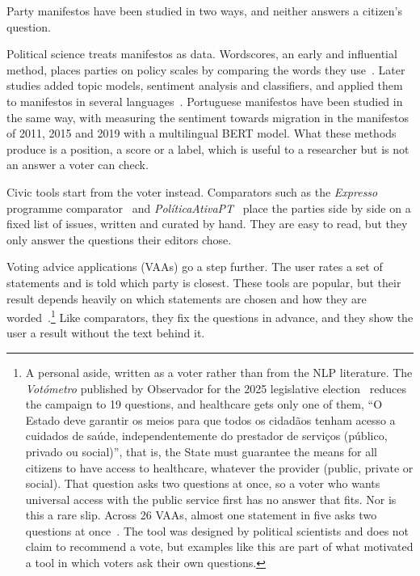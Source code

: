 Party manifestos have been studied in two ways, and neither answers a citizen's question.

Political science treats manifestos as data. Wordscores, an early and influential method, places parties on policy scales by comparing the words they use~\citep{laver_benoit_garry}. Later studies added topic models, sentiment analysis and classifiers, and applied them to manifestos in several languages~\citep{manifestos-nz,manifestos-central-eastern}. Portuguese manifestos have been studied in the same way, with \citet{marino-etal-2024-decoding} measuring the sentiment towards migration in the manifestos of 2011, 2015 and 2019 with a multilingual BERT model. What these methods produce is a position, a score or a label, which is useful to a researcher but is not an answer a voter can check.

Civic tools start from the voter instead. Comparators such as the \textit{Expresso} programme comparator~\citep{expresso-comparador} and \textit{PolíticaAtivaPT}~\citep{politicaativa-comparar} place the parties side by side on a fixed list of issues, written and curated by hand. They are easy to read, but they only answer the questions their editors chose.

Voting advice applications (VAAs) go a step further. The user rates a set of statements and is told which party is closest. These tools are popular, but their result depends heavily on which statements are chosen and how they are worded~\citep{walgrave2009statement}.\footnote{A personal aside, written as a voter rather than from the NLP literature. The \textit{Votómetro} published by Observador for the 2025 legislative election~\citep{observador2025votometro} reduces the campaign to 19 questions, and healthcare gets only one of them, ``O Estado deve garantir os meios para que todos os cidadãos tenham acesso a cuidados de saúde, independentemente do prestador de serviços (público, privado ou social)'', that is, the State must guarantee the means for all citizens to have access to healthcare, whatever the provider (public, private or social). That question asks two questions at once, so a voter who wants universal access with the public service first has no answer that fits. Nor is this a rare slip. Across 26 VAAs, almost one statement in five asks two questions at once~\citep{vancamp2014statements}. The tool was designed by political scientists and does not claim to recommend a vote, but examples like this are part of what motivated a tool in which voters ask their own questions.} Like comparators, they fix the questions in advance, and they show the user a result without the text behind it.

